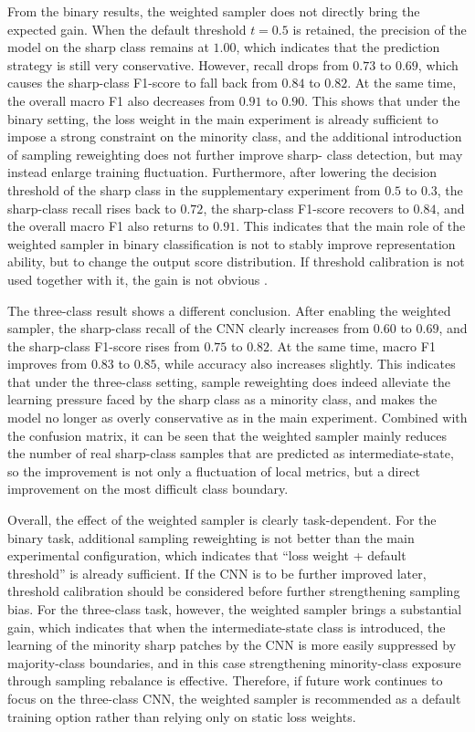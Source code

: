 \par From the binary results, the weighted sampler does not directly bring the
expected gain. When the default threshold $t=0.5$ is retained, the precision of
the model on the sharp class remains at $1.00$, which indicates that the
prediction strategy is still very conservative. However, recall drops from
$0.73$ to $0.69$, which causes the sharp-class F1-score to fall back from $0.84$
to $0.82$. At the same time, the overall macro F1 also decreases from $0.91$
to $0.90$. This shows that
under the binary setting, the loss weight in the main experiment is already
sufficient to impose a strong constraint on the minority class, and the
additional introduction of sampling reweighting does not further improve sharp-
class detection, but may instead enlarge training fluctuation. Furthermore,
after lowering the decision threshold of the sharp class in the supplementary
experiment from $0.5$ to $0.3$, the sharp-class recall rises back to $0.72$, the
sharp-class F1-score recovers to $0.84$, and the overall macro F1 also returns
to $0.91$.
This indicates that the main role of the weighted sampler in binary
classification is not to stably improve representation ability, but to change
the output score distribution. If threshold calibration is not used together
with it, the gain is not obvious \cite{davis2006relationship}.

\par The three-class result shows a different conclusion. After enabling the
weighted sampler, the sharp-class recall of the CNN clearly increases from
$0.60$ to $0.69$, and the sharp-class F1-score rises from $0.75$ to $0.82$.
At the same time, macro F1 improves from $0.83$ to $0.85$, while accuracy also
increases slightly. This indicates that under the three-class setting, sample reweighting
does indeed alleviate the learning pressure faced by the sharp class as a
minority class, and makes the model no longer as overly conservative as in the
main experiment. Combined with the confusion matrix, it can be seen that the
weighted sampler mainly reduces the number of real sharp-class samples that are
predicted as intermediate-state, so the improvement is not only a fluctuation of
local metrics, but a direct improvement on the most difficult class boundary.

\par Overall, the effect of the weighted sampler is clearly task-dependent. For
the binary task, additional sampling reweighting is not better than the main
experimental configuration, which indicates that ``loss weight + default
threshold'' is already sufficient. If the CNN is to be further improved later,
threshold calibration should be considered before further strengthening sampling
bias. For the three-class task, however, the weighted sampler brings a
substantial gain, which indicates that when the intermediate-state class is
introduced, the learning of the minority sharp patches by the CNN is more easily
suppressed by majority-class boundaries, and in this case strengthening
minority-class exposure through sampling rebalance is effective. Therefore, if
future work continues to focus on the three-class CNN, the weighted sampler is
recommended as a default training option rather than relying only on static loss
weights.

